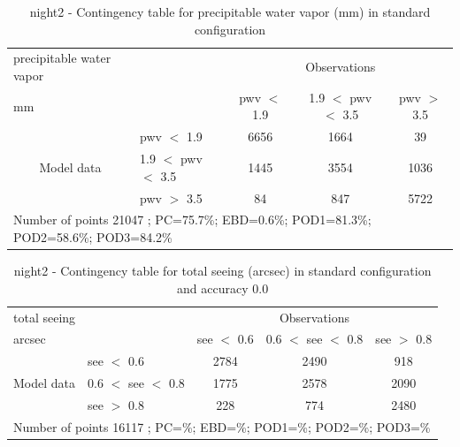 \begin{table}[p!]
\begin{center}
\begin{tabular}{llccc}
\hline
{precipitable water vapor}                                       &                                                    & \multicolumn{3}{c}{Observations}                 \\
{mm}                                       &                             & pwv $<$ 1.9   & 1.9 $<$ pwv $<$ 3.5 & pwv $>$ 3.5 \\
\hline
\multicolumn{1}{c}{\multirow{3}{*}{Model data}}  & pwv $<$ 1.9             & 6656                & 1664                       & 39              \\
                                                 & 1.9  $<$ pwv $<$ 3.5 & 1445                & 3554                       & 1036              \\
                                                 & pwv $>$ 3.5             & 84                & 847                       & 5722              \\
\hline
\multicolumn{5}{l}{ Number of points        21047 ; PC=75.7\%; EBD=0.6\%; POD1=81.3\%; POD2=58.6\%; POD3=84.2\%}                 \\
\end{tabular}
\end{center}
\caption{night2 - Contingency table for  precipitable water vapor (mm) in standard configuration  }
\label{tab:contingencypwvBEF:night2}
\end{table}
\clearpage
\begin{table}[p!]
\begin{center}
\begin{tabular}{llccc}
\hline
{total seeing}                                       &                                                    & \multicolumn{3}{c}{Observations}                 \\
{arcsec}                                       &                             & see $<$ 0.6   & 0.6 $<$ see $<$ 0.8 & see $>$ 0.8 \\
\hline
\multicolumn{1}{c}{\multirow{3}{*}{Model data}}  & see $<$ 0.6             & 2784                & 2490                       & 918              \\
                                                 & 0.6  $<$ see $<$ 0.8 & 1775                & 2578                       & 2090              \\
                                                 & see $>$ 0.8             & 228                & 774                       & 2480              \\
\hline
\multicolumn{5}{l}{ Number of points        16117 ; PC=\%; EBD=\%; POD1=\%; POD2=\%; POD3=\%}
\end{tabular}
\end{center}
\caption{night2 - Contingency table for  total seeing (arcsec) in standard configuration and accuracy 0.0}
\label{tab:contingencyseeBEF:night2}
\end{table}
